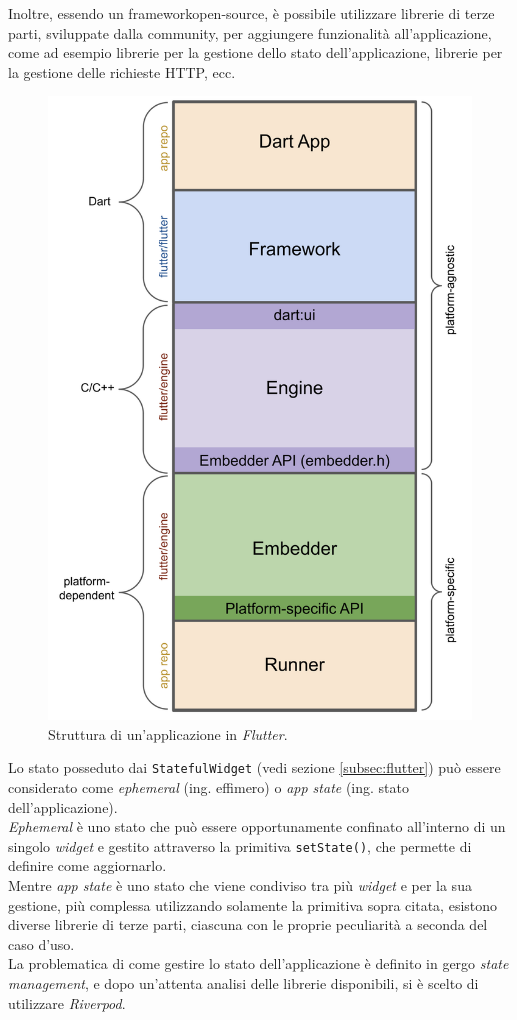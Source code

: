 Inoltre, essendo un \gls{framework}\glsoccur \gls{open-source}\glsoccur, è possibile utilizzare librerie di terze parti, sviluppate dalla community, per aggiungere funzionalità all'applicazione, come ad esempio librerie per la gestione dello stato dell'applicazione, librerie per la gestione delle richieste HTTP, ecc. \\

\begin{figure}[!h] 
    \centering 
    \includegraphics[width=0.4\columnwidth]{images/flutter-app-anatomy.png} 
    \caption{Struttura di un'applicazione in \emph{Flutter}.}
    \label{fig:architettura-flutter}
\end{figure}

Lo stato posseduto dai \lstinline{StatefulWidget} (vedi sezione \ref{subsec:flutter}) può essere considerato come \emph{ephemeral} (ing. effimero) o \emph{app state} (ing. stato dell'applicazione). \\
\emph{Ephemeral} è uno stato che può essere opportunamente confinato all'interno di un singolo \emph{widget} e gestito attraverso la primitiva \lstinline{setState()}, che permette di definire come aggiornarlo.\\
Mentre \emph{app state} è uno stato che viene condiviso tra più \emph{widget} e per la sua gestione, più complessa utilizzando solamente la primitiva sopra citata, esistono diverse librerie di terze parti, ciascuna con le proprie peculiarità a seconda del caso d'uso.\\
\indent La problematica di come gestire lo stato dell'applicazione è definito in gergo \emph{state management}\cite{site:flutter-state-mgmt}, e dopo un'attenta analisi delle librerie disponibili, si è scelto di utilizzare \emph{Riverpod}\cite{site:riverpod}.\\

